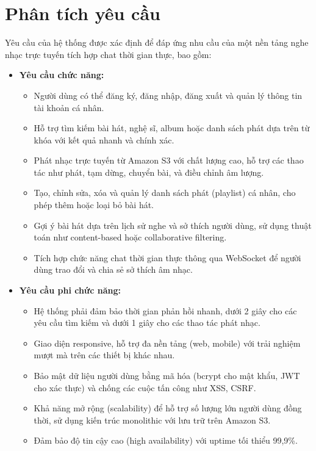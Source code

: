 \documentclass[a4paper,12pt]{report}
\begin{document}
\section{Phân tích yêu cầu}
Yêu cầu của hệ thống được xác định để đáp ứng nhu cầu của một nền tảng nghe nhạc trực tuyến tích hợp chat thời gian thực, bao gồm:

\begin{itemize}
    \item \textbf{Yêu cầu chức năng:}
        \begin{itemize}
            \item Người dùng có thể đăng ký, đăng nhập, đăng xuất và quản lý thông tin tài khoản cá nhân.
            \item Hỗ trợ tìm kiếm bài hát, nghệ sĩ, album hoặc danh sách phát dựa trên từ khóa với kết quả nhanh và chính xác.
            \item Phát nhạc trực tuyến từ Amazon S3 với chất lượng cao, hỗ trợ các thao tác như phát, tạm dừng, chuyển bài, và điều chỉnh âm lượng.
            \item Tạo, chỉnh sửa, xóa và quản lý danh sách phát (playlist) cá nhân, cho phép thêm hoặc loại bỏ bài hát.
            \item Gợi ý bài hát dựa trên lịch sử nghe và sở thích người dùng, sử dụng thuật toán như content-based hoặc collaborative filtering.
            \item Tích hợp chức năng chat thời gian thực thông qua WebSocket để người dùng trao đổi và chia sẻ sở thích âm nhạc.
        \end{itemize}
    \item \textbf{Yêu cầu phi chức năng:}
        \begin{itemize}
            \item Hệ thống phải đảm bảo thời gian phản hồi nhanh, dưới 2 giây cho các yêu cầu tìm kiếm và dưới 1 giây cho các thao tác phát nhạc.
            \item Giao diện responsive, hỗ trợ đa nền tảng (web, mobile) với trải nghiệm mượt mà trên các thiết bị khác nhau.
            \item Bảo mật dữ liệu người dùng bằng mã hóa (bcrypt cho mật khẩu, JWT cho xác thực) và chống các cuộc tấn công như XSS, CSRF.
            \item Khả năng mở rộng (scalability) để hỗ trợ số lượng lớn người dùng đồng thời, sử dụng kiến trúc monolithic với lưu trữ trên Amazon S3.
            \item Đảm bảo độ tin cậy cao (high availability) với uptime tối thiểu 99,9\%.
        \end{itemize}
\end{itemize}
\end{document}
